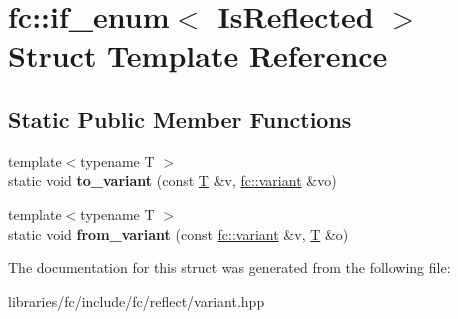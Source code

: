 \hypertarget{structfc_1_1if__enum}{}\section{fc\+:\+:if\+\_\+enum$<$ Is\+Reflected $>$ Struct Template Reference}
\label{structfc_1_1if__enum}
\subsection*{Static Public Member Functions}
\begin{DoxyCompactItemize}
\item 
\mbox{\label{structfc_1_1if__enum_a887c2ae7615074bf40b293aeabb748a3}} 
{\footnotesize template$<$typename T $>$ }\\static void {\bfseries to\+\_\+variant} (const \mbox{\hyperlink{struct_t}{T}} \&v, \mbox{\hyperlink{classfc_1_1variant}{fc\+::variant}} \&vo)
\item 
\mbox{\label{structfc_1_1if__enum_a515a22cd66ac2c9020fa6407a130c697}} 
{\footnotesize template$<$typename T $>$ }\\static void {\bfseries from\+\_\+variant} (const \mbox{\hyperlink{classfc_1_1variant}{fc\+::variant}} \&v, \mbox{\hyperlink{struct_t}{T}} \&o)
\end{DoxyCompactItemize}


The documentation for this struct was generated from the following file\+:\begin{DoxyCompactItemize}
\item 
libraries/fc/include/fc/reflect/variant.\+hpp\end{DoxyCompactItemize}
